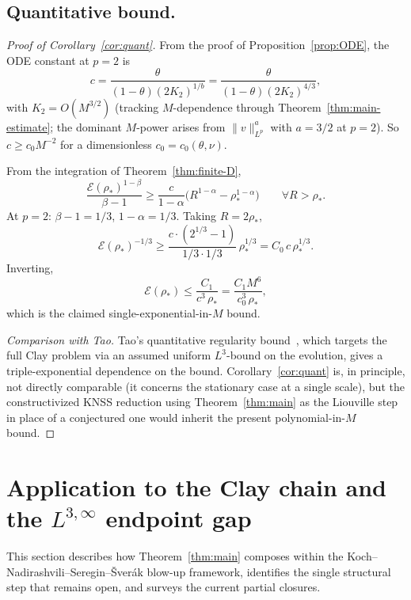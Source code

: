 \documentclass[11pt]{amsart}
\theoremstyle{definition}
\newcommand{\EE}{\mathcal{E}}    %
\newcommand{\norm}[1]{\|#1\|}
\begin{document}
\subsection{Quantitative bound.}
\label{ssec:quantitative}

\begin{proof}[Proof of Corollary~\ref{cor:quant}]
From the proof of Proposition~\ref{prop:ODE}, the ODE constant
at $p = 2$ is
\[
c = \frac{\theta}{(1 - \theta)(2K_2)^{1/b}}
= \frac{\theta}{(1 - \theta)(2K_2)^{4/3}},
\]
with $K_2 = O(M^{3/2})$ (tracking $M$-dependence through
Theorem~\ref{thm:main-estimate}; the dominant $M$-power arises
from $\norm{v}_{L^p}^a$ with $a = 3/2$ at $p = 2$). So $c \geq
c_0 M^{-2}$ for a dimensionless $c_0 = c_0(\theta, \nu)$.

From the integration of
Theorem~\ref{thm:finite-D},
\[
\frac{\EE(\rho_*)^{1 - \beta}}{\beta - 1}
\geq \frac{c}{1 - \alpha}\bigl(R^{1-\alpha} - \rho_*^{1-\alpha}\bigr)
\qquad\forall R > \rho_*.
\]
At $p = 2$: $\beta - 1 = 1/3$, $1 - \alpha = 1/3$. Taking
$R = 2\rho_*$,
\[
\EE(\rho_*)^{-1/3} \geq \frac{c \cdot (2^{1/3} - 1)}{1/3 \cdot 1/3}\,
\rho_*^{1/3}
= C_0\,c\,\rho_*^{1/3}.
\]
Inverting,
\[
\EE(\rho_*) \leq \frac{C_1}{c^3\,\rho_*}
= \frac{C_1 M^6}{c_0^3\,\rho_*},
\]
which is the claimed single-exponential-in-$M$ bound.

\emph{Comparison with Tao.}
Tao's quantitative regularity bound~\cite{Tao2019}, which targets
the full Clay problem via an assumed uniform $L^3$-bound on the
evolution, gives a triple-exponential dependence on the bound.
Corollary~\ref{cor:quant} is, in principle, not directly
comparable (it concerns the stationary case at a single scale),
but the constructivized KNSS reduction using
Theorem~\ref{thm:main} as the Liouville step in place of a
conjectured one would inherit the present polynomial-in-$M$ bound.
\end{proof}

\section{Application to the Clay chain and the $L^{3,\infty}$ endpoint gap}
\label{sec:clay-chain}

This section describes how Theorem~\ref{thm:main} composes within
the Koch--Nadirashvili--Seregin--\v{S}ver\'ak blow-up framework,
identifies the single structural step that remains open, and
surveys the current partial closures.
\end{document}

